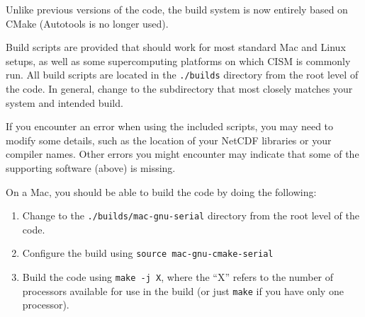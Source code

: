 Unlike previous versions of the code, the build system is now entirely based on CMake 
(Autotools is no longer used). 

Build scripts are provided that should work for most standard Mac and Linux setups, 
as well as some supercomputing platforms on which CISM is commonly run.
All build scripts are located in the \texttt{./builds} directory from the root level of the code.
In general, change to the subdirectory that most closely matches your system and intended
build.

If you encounter an error when using the included scripts, you may need to modify some details, 
such as the location of your NetCDF libraries or your compiler names.  Other errors you might 
encounter may indicate that some of the supporting software (above) is missing.


\begin{mdframed}[style=mac] %
On a Mac, you should be able to build the code by doing the following:

\begin{enumerate}
\item{Change to the \texttt{./builds/mac-gnu-serial} directory from the root level of the code.}
\item{Configure the build using \texttt{source mac-gnu-cmake-serial}}
\item{Build the code using \texttt{make -j X}, where the ``X'' refers to the number of processors available for use in the build (or just \texttt{make} if you have only one processor).}
\end{enumerate}
\end{mdframed}              %


